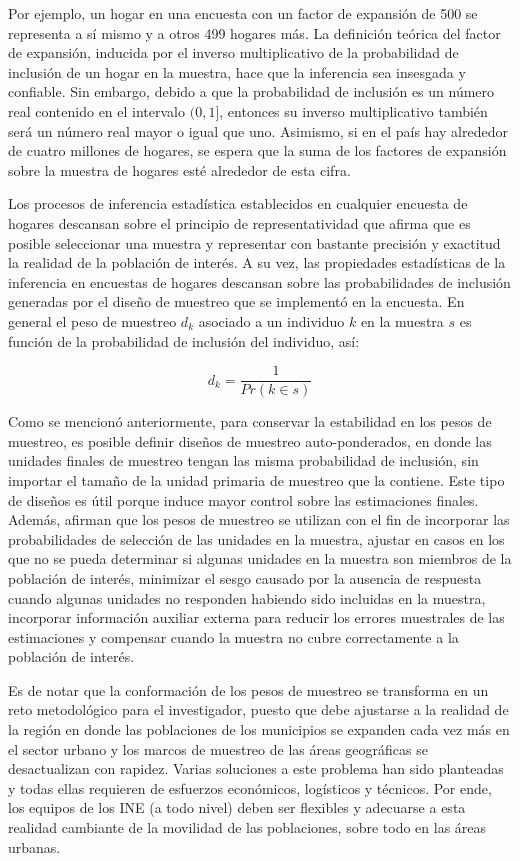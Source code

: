 \documentclass[
  12pt,
]{book}
\begin{document}
Por ejemplo, un hogar en una encuesta con un factor de expansión de 500 se representa a sí mismo y a otros 499 hogares más. La definición teórica del factor de expansión, inducida por el inverso multiplicativo de la probabilidad de inclusión de un hogar en la muestra, hace que la inferencia sea insesgada y confiable. Sin embargo, debido a que la probabilidad de inclusión es un número real contenido en el intervalo \((0, 1]\), entonces su inverso multiplicativo también será un número real mayor o igual que uno. Asimismo, si en el país hay alrededor de cuatro millones de hogares, se espera que la suma de los factores de expansión sobre la muestra de hogares esté alrededor de esta cifra.

Los procesos de inferencia estadística establecidos en cualquier encuesta de hogares descansan sobre el principio de representatividad que afirma que es posible seleccionar una muestra y representar con bastante precisión y exactitud la realidad de la población de interés. A su vez, las propiedades estadísticas de la inferencia en encuestas de hogares descansan sobre las probabilidades de inclusión generadas por el diseño de muestreo que se implementó en la encuesta. En general el peso de muestreo \(d_k\) asociado a un individuo \(k\) en la muestra \(s\) es función de la probabilidad de inclusión del individuo, así:

\[
d_k = \frac{1}{Pr(k\in s)}
\]

Como se mencionó anteriormente, para conservar la estabilidad en los pesos de muestreo, es posible definir diseños de muestreo auto-ponderados, en donde las unidades finales de muestreo tengan las misma probabilidad de inclusión, sin importar el tamaño de la unidad primaria de muestreo que la contiene. Este tipo de diseños es útil porque induce mayor control sobre las estimaciones finales. Además, \citet{Valliant_Dever_2017} afirman que los pesos de muestreo se utilizan con el fin de incorporar las probabilidades de selección de las unidades en la muestra, ajustar en casos en los que no se pueda determinar si algunas unidades en la muestra son miembros de la población de interés, minimizar el sesgo causado por la ausencia de respuesta cuando algunas unidades no responden habiendo sido incluidas en la muestra, incorporar información auxiliar externa para reducir los errores muestrales de las estimaciones y compensar cuando la muestra no cubre correctamente a la población de interés.

Es de notar que la conformación de los pesos de muestreo se transforma en un reto metodológico para el investigador, puesto que debe ajustarse a la realidad de la región en donde las poblaciones de los municipios se expanden cada vez más en el sector urbano y los marcos de muestreo de las áreas geográficas se desactualizan con rapidez. Varias soluciones a este problema han sido planteadas \citep{Gambino_Silva_2009} y todas ellas requieren de esfuerzos económicos, logísticos y técnicos. Por ende, los equipos de los INE (a todo nivel) deben ser flexibles y adecuarse a esta realidad cambiante de la movilidad de las poblaciones, sobre todo en las áreas urbanas.
\end{document}
